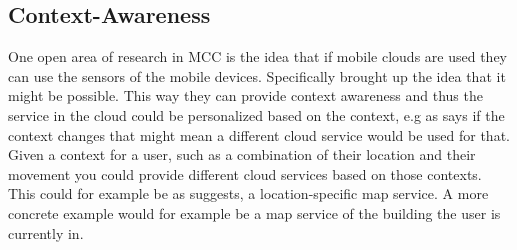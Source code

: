 \subsection{Context-Awareness}
One open area of research in MCC is the idea that if mobile clouds are used they can use the sensors of the mobile devices. 
Specifically \citet{5557960} brought up the idea that it might be possible.
This way they can provide context awareness and thus the service in the cloud could be personalized based on the context, e.g as \citet{fernando2013mobile} says if the context changes that might mean a different cloud service would be used for that. 
Given a context for a user, such as a combination of their location and their movement you could provide different cloud services based on those contexts. This could for example be as \citet{5557960} suggests, a location-specific map service. 
A more concrete example would for example be a map service of the building the user is currently in. 
\citep{sanaei2014heterogeneity}